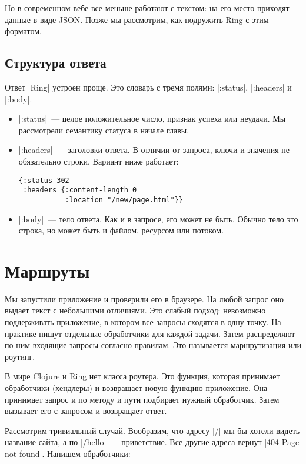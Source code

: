 Но в современном вебе все меньше работают с текстом: на его место приходят данные в виде
JSON. Позже мы рассмотрим, как подружить Ring с этим форматом.

\subsection{Структура ответа}

Ответ \spverb|Ring| устроен проще. Это словарь с тремя полями:
\spverb|:status|, \spverb|:headers| и \spverb|:body|.

\begin{itemize}

\item
  \spverb|:status|~--- целое положительное число, признак успеха или неудачи. Мы
  рассмотрели семантику статуса в начале главы.

\item
  \spverb|:headers|~--- заголовки ответа. В отличии от запроса, ключи и
  значения не обязательно строки. Вариант ниже работает:

\begin{verbatim}
{:status 302
 :headers {:content-length 0
           :location "/new/page.html"}}
\end{verbatim}

\item
  \spverb|:body|~--- тело ответа. Как и в запросе, его может не быть. Обычно тело
  это строка, но может быть и файлом, ресурсом или потоком.

\end{itemize}

\section{Маршруты}

Мы запустили приложение и проверили его в браузере. На любой запрос оно выдает
текст с небольшими отличиями. Это слабый подход: невозможно поддерживать
приложение, в котором все запросы сходятся в одну точку. На практике пишут
отдельные обработчики для каждой задачи. Затем распределяют по ним входящие
запросы согласно правилам. Это называется маршрутизация или роутинг.

В мире Clojure и Ring нет класса роутера. Это функция, которая принимает
обработчики (хендлеры) и возвращает новую функцию-приложение. Она принимает
запрос и по методу и пути подбирает нужный обработчик. Затем вызывает его с
запросом и возвращает ответ.

Рассмотрим тривиальный случай. Вообразим, что адресу \spverb|/| мы бы хотели видеть
название сайта, а по \spverb|/hello|~--- приветствие. Все другие адреса вернут
\spverb|404 Page not found|. Напишем обработчики:

